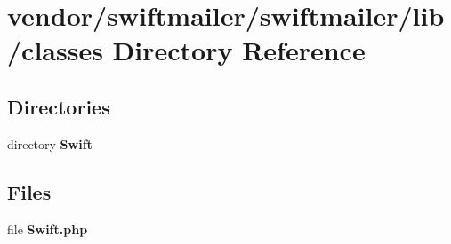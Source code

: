 \section{vendor/swiftmailer/swiftmailer/lib/classes Directory Reference}
\label{dir_25f290354623dc996f1819f78dae85bc}
\subsection*{Directories}
\begin{DoxyCompactItemize}
\item 
directory {\bf Swift}
\end{DoxyCompactItemize}
\subsection*{Files}
\begin{DoxyCompactItemize}
\item 
file {\bf Swift.\+php}
\end{DoxyCompactItemize}

